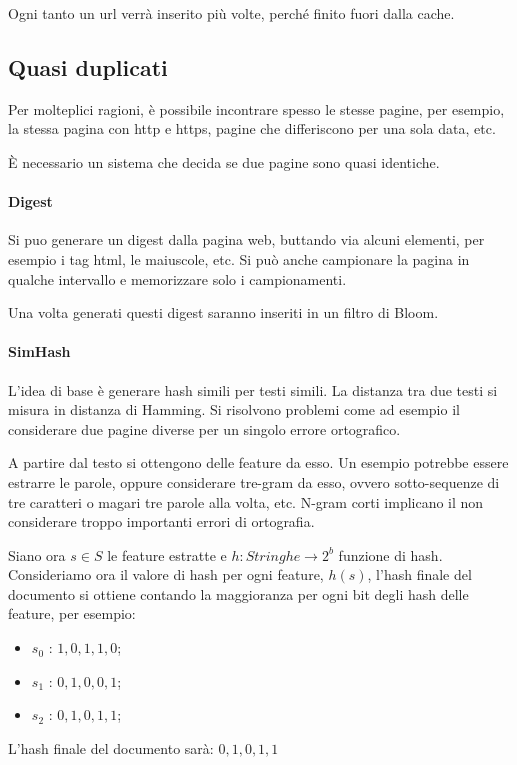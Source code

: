 Ogni tanto un url verrà inserito più volte, perché finito fuori dalla cache.

\subsection{Quasi duplicati}
Per molteplici ragioni, è possibile incontrare spesso le stesse pagine, 
per esempio, la stessa pagina con http e https, pagine che differiscono per una 
sola data, etc.

È necessario un sistema che decida se due pagine sono quasi identiche.

\paragraph{Digest}
Si puo generare un digest dalla pagina web, buttando via alcuni elementi, 
per esempio i tag html, le maiuscole, etc.
Si può anche campionare la pagina in qualche intervallo e memorizzare solo 
i campionamenti.

Una volta generati questi digest saranno inseriti in un filtro di Bloom.

\paragraph{SimHash}
L'idea di base è generare hash simili per testi simili. La distanza tra due testi 
si misura in distanza di Hamming.
Si risolvono problemi come ad esempio il considerare due pagine diverse per un 
singolo errore ortografico.

A partire dal testo si ottengono delle feature da esso. Un esempio potrebbe essere 
estrarre le parole, oppure considerare tre-gram da esso, ovvero sotto-sequenze di tre 
caratteri o magari tre parole alla volta, etc.
N-gram corti implicano il non considerare troppo importanti errori di ortografia.

Siano ora $s \in S$ le feature estratte e $h : \mathit{Stringhe} \rightarrow 2^b$ funzione 
di hash.
Consideriamo ora il valore di hash per ogni feature, $h(s)$, l'hash finale del documento 
si ottiene contando la maggioranza per ogni bit degli hash delle feature, per esempio: 
\begin{itemize}
    \item $s_0$ : $1,0,1,1,0$;
    \item $s_1$ : $0,1,0,0,1$;
    \item $s_2$ : $0,1,0,1,1$;
\end{itemize}
L'hash finale del documento sarà: $0, 1, 0, 1, 1$

